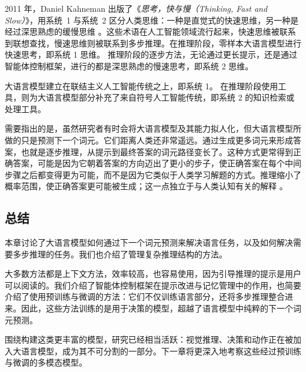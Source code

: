 2011 年，Daniel Kahneman 出版了《{\em 思考，快与慢（Thinking, Fast and Slow）}》，用系统~1 与系统~2 区分人类思维：一种是直觉式的快速思维，另一种是经过深思熟虑的缓慢思维 \citep{kahneman2011thinking}。这些术语在人工智能领域流行起来，快速思维被联系到联想查找，慢速思维则被联系到多步推理。在推理阶段，零样本大语言模型进行快速思考，即系统 1 思维。
推理阶段的逐步方法，无论通过更长提示，还是通过智能体控制框架，进行的都是深思熟虑的慢速思考，即系统 2 思维。

大语言模型建立在联结主义人工智能传统之上，即系统 1。
在推理阶段使用工具，则为大语言模型部分补充了来自符号人工智能传统，即系统 2 的知识检索或处理工具。

需要指出的是，虽然研究者有时会将大语言模型及其能力拟人化，但大语言模型所做的只是预测下一个词元。它们距离人类还非常遥远。通过生成更多词元来形成答案，也就是逐步推理，从提示到最终答案的词元路径变长了。这种方式更常得到正确答案，可能是因为它朝着答案的方向迈出了更小的步子，使正确答案在每个中间步骤之后都变得更为可能，而不是因为它类似于人类学习解题的方式。推理缩小了概率范围，使正确答案更可能被生成；这一点独立于与人类认知有关的解释 \citep{guo2025deepseek}。

\subsection{总结}
本章讨论了大语言模型如何通过下一个词元预测来解决语言任务，以及如何解决需要多步推理的任务。我们也介绍了管理复杂推理结构的方法。

大多数方法都是上下文方法，效率较高，也容易使用，因为引导推理的提示是用户可以阅读的。我们介绍了智能体控制框架在提示改进与记忆管理中的作用，也简要介绍了使用预训练与微调的方法：它们不仅训练语言部分，还将多步推理整合进来。因此，这些方法训练的是用于决策的模型，超越了语言模型中纯粹的下一个词元预测。

围绕构建这类更丰富的模型，研究已经相当活跃：视觉推理、决策和动作正在被加入大语言模型，成为其不可分割的一部分。下一章将更深入地考察这些经过预训练与微调的多模态模型。



